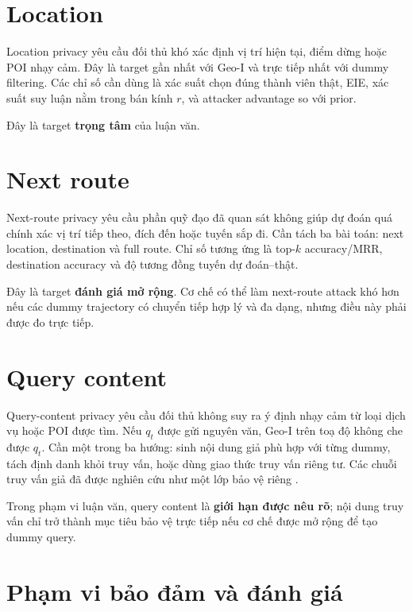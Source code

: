 \documentclass[12pt,a4paper,oneside]{report}
\newcommand{\core}{\textcolor{reportred}{\textbf{trọng tâm}}}
\begin{document}
\section{Location}

Location privacy yêu cầu đối thủ khó xác định vị trí hiện tại, điểm dừng hoặc POI nhạy cảm. Đây là target gần nhất với Geo-I và trực tiếp nhất với dummy filtering. Các chỉ số cần dùng là xác suất chọn đúng thành viên thật, EIE, xác suất suy luận nằm trong bán kính $r$, và attacker advantage so với prior.

Đây là target \core{} của luận văn.

\section{Next route}

Next-route privacy yêu cầu phần quỹ đạo đã quan sát không giúp dự đoán quá chính xác vị trí tiếp theo, đích đến hoặc tuyến sắp đi. Cần tách ba bài toán: next location, destination và full route. Chỉ số tương ứng là top-$k$ accuracy/MRR, destination accuracy và độ tương đồng tuyến dự đoán--thật.

Đây là target \textbf{đánh giá mở rộng}. Cơ chế có thể làm next-route attack khó hơn nếu các dummy trajectory có chuyển tiếp hợp lý và đa dạng, nhưng điều này phải được đo trực tiếp.

\section{Query content}

Query-content privacy yêu cầu đối thủ không suy ra ý định nhạy cảm từ loại dịch vụ hoặc POI được tìm. Nếu $q_t$ được gửi nguyên văn, Geo-I trên toạ độ không che được $q_t$. Cần một trong ba hướng: sinh nội dung giả phù hợp với từng dummy, tách định danh khỏi truy vấn, hoặc dùng giao thức truy vấn riêng tư. Các chuỗi truy vấn giả đã được nghiên cứu như một lớp bảo vệ riêng \citep{wu2021fakequery,liu2026fakequeries}.

Trong phạm vi luận văn, query content là \textbf{giới hạn được nêu rõ}; nội dung truy vấn chỉ trở thành mục tiêu bảo vệ trực tiếp nếu cơ chế được mở rộng để tạo dummy query.

\section{Phạm vi bảo đảm và đánh giá}
\end{document}
